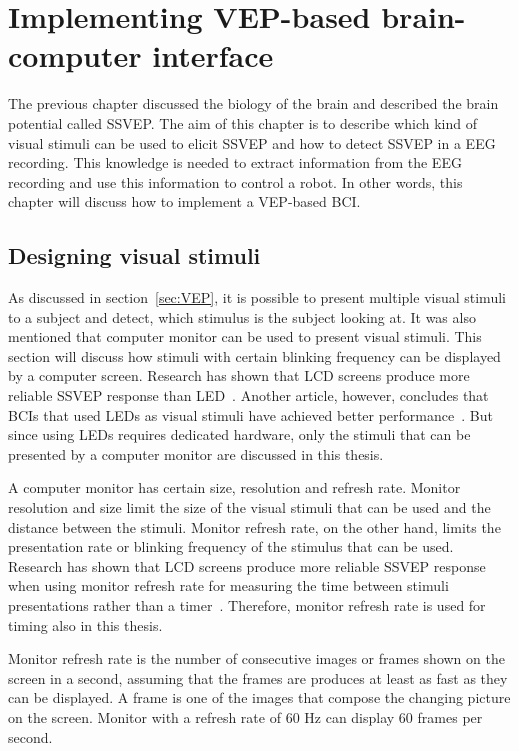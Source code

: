 
\chapter{Implementing VEP-based brain-computer interface}

The previous chapter discussed the biology of the brain and described the brain potential called \gls{SSVEP}. The aim of this chapter is to describe which kind of visual stimuli can be used to elicit \gls{SSVEP} and how to detect \gls{SSVEP} in a \gls{EEG} recording. This knowledge is needed to extract information from the \gls{EEG} recording and use this information to control a robot. In other words, this chapter will discuss how to implement a \gls{VEP}-based \gls{BCI}.

\section{Designing visual stimuli}
\label{sec:stimuli}

As discussed in section~\ref{sec:VEP}, it is possible to present multiple visual stimuli to a subject and detect, which stimulus is the subject looking at. It was also mentioned that computer monitor can be used to present visual stimuli. This section will discuss how stimuli with certain blinking frequency can be displayed by a computer screen. Research has shown that LCD screens produce more reliable \gls{SSVEP} response than \gls{LED}~\cite{lcd_lcd_led}. Another article, however, concludes that \glspl{BCI} that used \glspl{LED} as visual stimuli have achieved better performance~\cite{ssvep_stim}. But since using \glspl{LED} requires dedicated hardware, only the stimuli that can be presented by a computer monitor are discussed in this thesis.

A computer monitor has certain size, resolution and \gls{refresh rate}. Monitor resolution and size limit the size of the visual stimuli that can be used and the distance between the stimuli. Monitor \gls{refresh rate}, on the other hand, limits the presentation rate or blinking frequency of the stimulus that can be used. Research has shown that LCD screens produce more reliable \gls{SSVEP} response when using monitor \gls{refresh rate} for measuring the time between stimuli presentations rather than a timer~\cite{lcd_lcd_led}. Therefore, monitor \gls{refresh rate} is used for timing also in this thesis.

Monitor \gls{refresh rate} is the number of consecutive images or \glspl{frame} shown on the screen in a second, assuming that the \glspl{frame} are produces at least as fast as they can be displayed. A \gls{frame} is one of the images that compose the changing picture on the screen. Monitor with a \gls{refresh rate} of 60 Hz can display 60 \glspl{frame} per second. 


